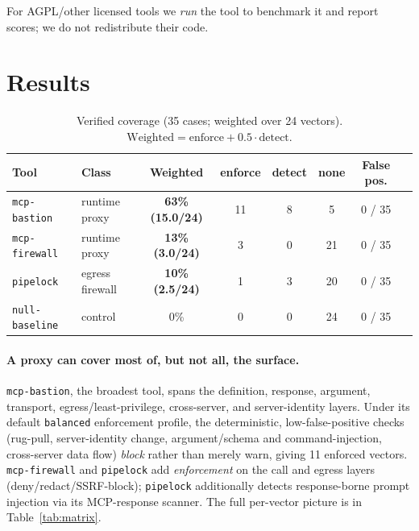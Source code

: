 \documentclass[11pt]{article}
\newcommand{\code}[1]{\texttt{\small #1}}
\newcommand{\cov}[1]{\textbf{#1}}
\begin{document}
For AGPL/other licensed tools we \emph{run} the tool to benchmark it and report scores; we do not redistribute their code.

\section{Results}
\label{sec:results}

\begin{table}[h]
\centering
\caption{Verified coverage (35 cases; weighted over 24 vectors). $\text{Weighted}=\text{enforce}+0.5\cdot\text{detect}$.}
\label{tab:coverage}
\small
\begin{tabular}{@{}llcccccc@{}}
\toprule
Tool & Class & Weighted & enforce & detect & none & False pos. \\
\midrule
\code{mcp-bastion}  & runtime proxy   & \cov{63\% (15.0/24)} & 11 & 8 & 5  & 0 / 35 \\
\code{mcp-firewall} & runtime proxy   & \cov{13\% (3.0/24)}  & 3  & 0 & 21 & 0 / 35 \\
\code{pipelock}     & egress firewall & \cov{10\% (2.5/24)}  & 1  & 3 & 20 & 0 / 35 \\
\code{null-baseline}& control         & 0\%                  & 0  & 0 & 24 & 0 / 35 \\
\bottomrule
\end{tabular}
\end{table}

\paragraph{A proxy can cover most of, but not all, the surface.} \code{mcp-bastion}, the broadest tool, spans the definition, response, argument, transport, egress/least-privilege, cross-server, and server-identity layers. Under its default \code{balanced} enforcement profile, the deterministic, low-false-positive checks (rug-pull, server-identity change, argument/schema and command-injection, cross-server data flow) \emph{block} rather than merely warn, giving 11 enforced vectors. \code{mcp-firewall} and \code{pipelock} add \emph{enforcement} on the call and egress layers (deny/redact/SSRF-block); \code{pipelock} additionally detects response-borne prompt injection via its MCP-response scanner. The full per-vector picture is in Table~\ref{tab:matrix}.
\end{document}
